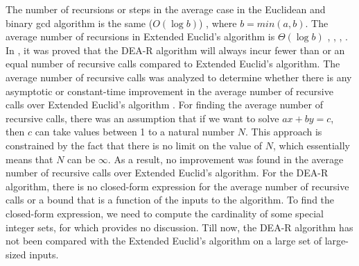 \documentclass[pdflatex,sn-mathphys-num]{sn-jnl}%
\theoremstyle{thmstyleone}%
\theoremstyle{thmstyletwo}%
\theoremstyle{thmstylethree}%
\begin{document}
 \par The number of recursions or steps in the average case in the Euclidean and binary gcd algorithm is the same ($O(\log b)$) \cite{knuth2014art}, where $b=min(a,b)$. The average number of recursions in Extended Euclid's algorithm is $\Theta(\log b)$ \cite{cormen2009introduction}, \cite{hensley1994number}, \cite{heilbronn1969average}, \cite{dixon1970number}.   In \cite{deora2023algorithm}, it was proved that the DEA-R algorithm will always incur fewer than or an equal number of recursive calls compared to Extended Euclid's algorithm.  The average number of recursive calls was analyzed to determine whether there is any asymptotic or constant-time improvement in the average number of recursive calls over Extended Euclid's algorithm \cite{cormen2009introduction}. 
 For finding the average number of recursive calls, there was an assumption that if we want to solve $ax+by=c$, then $c$ can take values between 1 to a natural number $N$. This approach is constrained by the fact that there is no limit on the value of $N$, which essentially means that $N$ can be $\infty$. As a result, no  improvement  was found in the average number of recursive calls over Extended Euclid's algorithm. For the DEA-R algorithm, there is no closed-form expression for the average number of recursive calls or a bound that is a function of the inputs to the algorithm. To find the closed-form expression, we need to compute the cardinality of some special integer sets, for which \cite{deora2023algorithm} provides no discussion. Till now, the DEA-R algorithm has not been compared with the Extended Euclid's algorithm on a large set of large-sized inputs.
 
\end{document}
